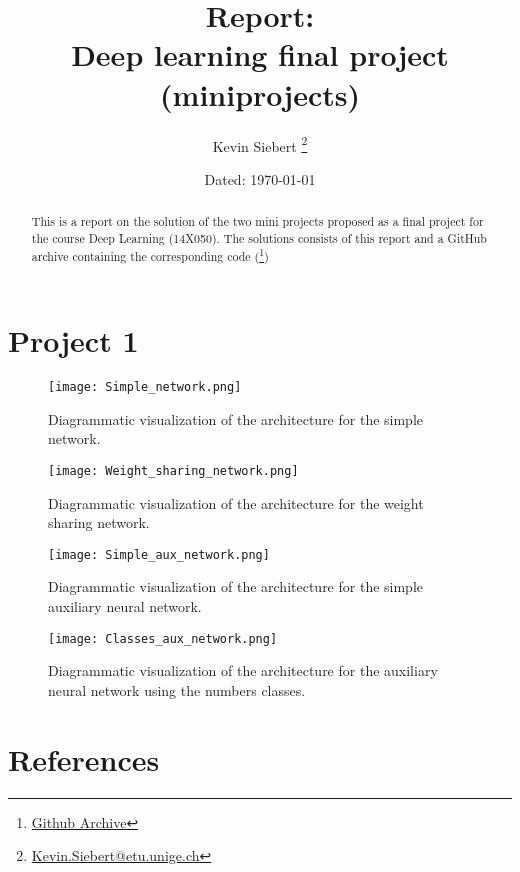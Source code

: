 \documentclass[11pt,english]{article}
\title{\textbf{Report: \\ Deep learning final project (miniprojects)}}
\author{Kevin Siebert%
	\thanks{\href{mailto:Kevin.Siebert@etu.unige.ch}{Kevin.Siebert@etu.unige.ch}}}
\affil{Department of Informatics, Faculty of Science, \\ University of Geneva}
\date{Dated: \today}
\begin{document}
	\maketitle
	
	\begin{abstract}
		This is a report on the solution of the two mini projects proposed as a final project for the course Deep Learning (14X050). The solutions consists of this report and a GitHub archive containing the corresponding code (\thanks{\href{https://github.com/I-am-Rudi/DL_FinalProject}{Github Archive}})
	\end{abstract}
	
	\section*{Project 1} \label{sec:Introduction}
	\begin{figure}[H]
		\centering
		\texttt{[image: Simple\_network.png]}
		\caption{Diagrammatic visualization of the architecture for the simple network.}
		\label{fig:sn}
	\end{figure}
	\begin{figure}[H]
		\centering
		\texttt{[image: Weight\_sharing\_network.png]}
		\caption{Diagrammatic visualization of the architecture for the weight sharing network.}
		\label{fig:sn}
	\end{figure}
	\begin{figure}[H]
		\centering
		\texttt{[image: Simple\_aux\_network.png]}
		\caption{Diagrammatic visualization of the architecture for the simple auxiliary neural network.}
		\label{fig:saux}
	\end{figure}
	\begin{figure}[H]
		\centering
		\texttt{[image: Classes\_aux\_network.png]}
		\caption{Diagrammatic visualization of the architecture for the auxiliary neural network using the numbers classes.}
		\label{fig:caux}
	\end{figure}
	
	
	\section*{References}
\end{document}
